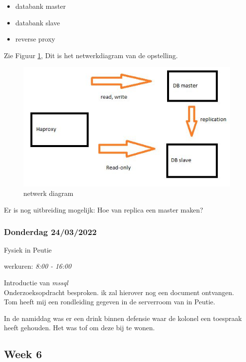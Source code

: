 \begin{itemize}
    \item
    databank master
    \item
    databank slave
    \item
    reverse proxy
\end{itemize}

Zie Figuur \ref{fig:netwerkdiagram-db-replicatie}, Dit is het netwerkdiagram van de opstelling.

\begin{figure}
    \centering
    \includegraphics{img/networkdiagram_db_replication.JPG}
    \caption{\label{fig:netwerkdiagram-db-replicatie}netwerk diagram}
\end{figure}

Er is nog uitbreiding mogelijk: Hoe van replica een master maken?

\subsubsection{Donderdag 24/03/2022}

Fysiek in Peutie

werkuren: \emph{8:00 - 16:00}

Introductie van \emph{mssql}\\
Onderzoeksopdracht besproken. ik zal hierover nog een document
ontvangen.\\
Tom heeft mij een rondleiding gegeven in de serverroom van in Peutie.

In de namiddag was er een drink binnen defensie waar de kolonel een
toespraak heeft gehouden. Het was tof om deze bij te wonen.

\subsection{Week 6}

